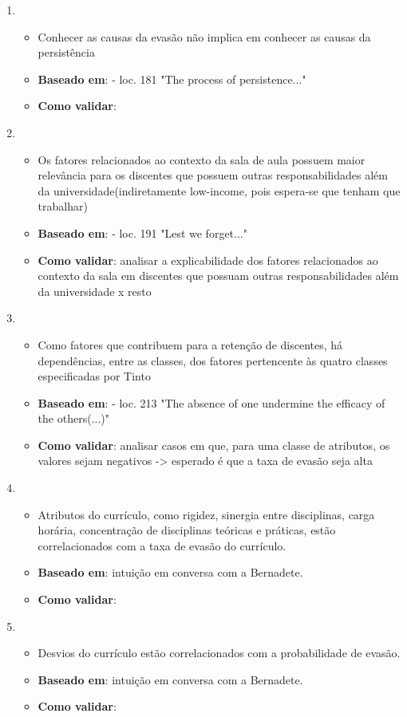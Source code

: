 \documentclass{report}
\begin{document}
\begin{enumerate}
\item 
	\begin{itemize}
	\item Conhecer as causas da evasão não implica em conhecer as causas da persistência
	\item \textbf{Baseado em}: \cite{tinto_completing} - loc. 181 "The process of persistence..."
	\item \textbf{Como validar}: 
	\end{itemize}
	
\item 
	\begin{itemize}
	\item Os fatores relacionados ao contexto da sala de aula possuem maior relevância para os discentes que possuem outras responsabilidades além da universidade(indiretamente low-income, pois espera-se que tenham que trabalhar)
	\item \textbf{Baseado em}: \cite{tinto_completing} - loc. 191 "Lest we forget..."
	\item \textbf{Como validar}: analisar a explicabilidade dos fatores relacionados ao contexto da sala em discentes que possuam outras responsabilidades além da universidade x resto
	\end{itemize}
	
\item 
	\begin{itemize}
	\item Como fatores que contribuem para a retenção de discentes, há dependências, entre as classes, dos fatores pertencente às quatro classes especificadas por Tinto
	\item \textbf{Baseado em}: \cite{tinto_completing} - loc. 213 "The absence of one undermine the efficacy of the others(...)"
	\item \textbf{Como validar}: analisar casos em que, para uma classe de atributos, os valores sejam negativos -> esperado é que a taxa de evasão seja alta
	\end{itemize}
	
\item 
	\begin{itemize}
	\item Atributos do currículo, como rigidez, sinergia entre disciplinas, carga horária, concentração de disciplinas teóricas e práticas, estão correlacionados com a taxa de evasão do currículo.
	\item \textbf{Baseado em}: intuição em conversa com a Bernadete.
	\item \textbf{Como validar}: 
	\end{itemize}	

\item 
	\begin{itemize}
	\item Desvios do currículo estão correlacionados com a probabilidade de evasão.
	\item \textbf{Baseado em}: intuição em conversa com a Bernadete.
	\item \textbf{Como validar}: 
	\end{itemize}	

\end{enumerate}
\end{document}

